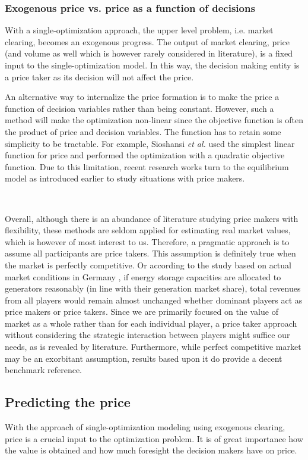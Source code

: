 \subsubsection{Exogenous price vs. price as a function of decisions}

With a single-optimization approach, the upper level problem, i.e. market clearing, becomes an exogenous progress. The output of market clearing, price (and volume as well which is however rarely considered in literature), is a fixed input to the single-optimization model. In this way, the decision making entity is a price taker as its decision will not affect the price. 

An alternative way to internalize the price formation is to make the price a function of decision variables rather than being constant. However, such a method will make the optimization non-linear since the objective function is often the product of price and decision variables. The function has to retain some simplicity to be tractable. For example, Sioshansi \textit{et al.} \cite{Sioshansi2009,Sioshansi2010} used the simplest linear function for price and performed the optimization with a quadratic objective function. Due to this limitation, recent research works turn to the equilibrium model as introduced earlier to study situations with price makers. 

~\newline

Overall, although there is an abundance of literature studying price makers with flexibility, these methods are seldom applied for estimating real market values, which is however of most interest to us. Therefore, a pragmatic approach is to assume all participants are price takers. This assumption is definitely true when the market is perfectly competitive. Or according to the study based on actual market conditions in Germany \cite{Schill2011}, if energy storage capacities are allocated to generators reasonably (in line with their generation market share), total revenues from all players would remain almost unchanged whether dominant players act as price makers or price takers. Since we are primarily focused on the value of market as a whole rather than for each individual player, a price taker approach without considering the strategic interaction between players might suffice our needs, as is revealed by literature. Furthermore, while perfect competitive market may be an exorbitant assumption,  results based upon it do provide a decent benchmark reference.

\subsection{Predicting the price}
\label{sec:lit-price}
With the approach of single-optimization modeling using exogenous clearing, price is a crucial input to the optimization problem. It is of great importance how the value is obtained and how much foresight the decision makers have on price.

